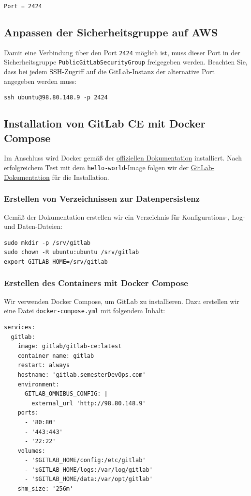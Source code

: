 \documentclass[a4paper,12pt]{article}
\begin{document}
\begin{verbatim}
Port = 2424
\end{verbatim}

\subsection{Anpassen der Sicherheitsgruppe auf AWS}
Damit eine Verbindung über den Port \texttt{2424} möglich ist, muss dieser Port in der Sicherheitsgruppe \texttt{PublicGitLabSecurityGroup} freigegeben werden. Beachten Sie, dass bei jedem SSH-Zugriff auf die GitLab-Instanz der alternative Port angegeben werden muss:

\begin{verbatim}
ssh ubuntu@98.80.148.9 -p 2424
\end{verbatim}

\subsection{Installation von GitLab CE mit Docker Compose}

Im Anschluss wird Docker gemäß der \href{https://docs.docker.com/engine/install/ubuntu/}{offiziellen Dokumentation} installiert. Nach erfolgreichem Test mit dem \texttt{hello-world}-Image folgen wir der \href{https://docs.gitlab.com/ee/install/docker/installation.html}{GitLab-Dokumentation} für die Installation.

\subsubsection{Erstellen von Verzeichnissen zur Datenpersistenz}
Gemäß der Dokumentation erstellen wir ein Verzeichnis für Konfigurations-, Log- und Daten-Dateien:

\begin{verbatim}
sudo mkdir -p /srv/gitlab
sudo chown -R ubuntu:ubuntu /srv/gitlab
export GITLAB_HOME=/srv/gitlab
\end{verbatim}

\newpage

\subsubsection{Erstellen des Containers mit Docker Compose}
Wir verwenden Docker Compose, um GitLab zu installieren. Dazu erstellen wir eine Datei \texttt{docker-compose.yml} mit folgendem Inhalt:

\begin{verbatim}
services:
  gitlab:
    image: gitlab/gitlab-ce:latest
    container_name: gitlab
    restart: always
    hostname: 'gitlab.semesterDevOps.com'
    environment:
      GITLAB_OMNIBUS_CONFIG: |
        external_url 'http://98.80.148.9'
    ports:
      - '80:80'
      - '443:443'
      - '22:22'
    volumes:
      - '$GITLAB_HOME/config:/etc/gitlab'
      - '$GITLAB_HOME/logs:/var/log/gitlab'
      - '$GITLAB_HOME/data:/var/opt/gitlab'
    shm_size: '256m'
\end{verbatim}
\end{document}
